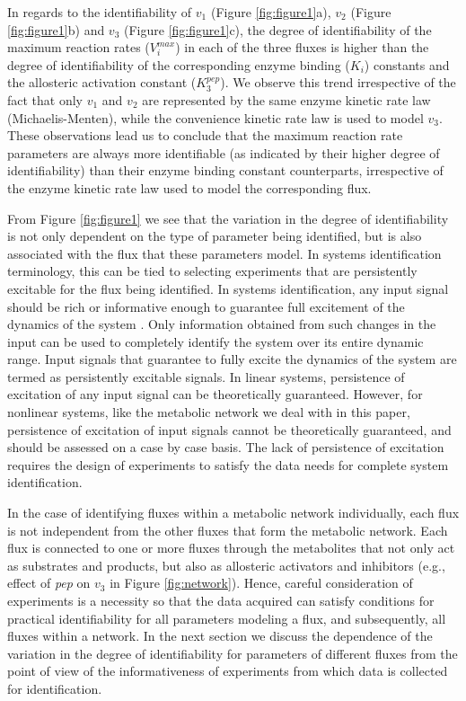 \documentclass[10pt]{article}
\begin{document}
In regards to the identifiability of $v_1$ (Figure \ref{fig:figure1}a), $v_2$ (Figure \ref{fig:figure1}b) and $v_3$ (Figure \ref{fig:figure1}c), the degree of identifiability of the maximum reaction rates ($V_i^{max}$) in each of the three fluxes is higher than the degree of identifiability of the corresponding enzyme binding ($K_i$) constants and the allosteric activation constant ($K_3^{pep}$). We observe this trend irrespective of the fact that only  $v_1$ and $v_2$ are represented by the same enzyme kinetic rate law (Michaelis-Menten), while the convenience kinetic rate law is used to model $v_3$. These observations lead us to conclude that the maximum reaction rate parameters are always more identifiable (as indicated by their higher degree of identifiability) than their enzyme binding constant counterparts, irrespective of the enzyme kinetic rate law used to model the corresponding flux.

From Figure \ref{fig:figure1} we see that the variation in the degree of identifiability is not only dependent on the type of parameter being identified, but is also associated with the flux that these parameters model.	In systems identification terminology, this can be tied to selecting experiments that are persistently excitable for the flux being identified. In systems identification, any input signal should be rich or informative enough to guarantee full excitement of the dynamics of the system \parencite{Ljung1994}. Only information obtained from such changes in the input can be used to completely identify the system over its entire dynamic range. Input signals that guarantee to fully excite the dynamics of the system are termed as persistently excitable signals. In linear systems, persistence of excitation of any input signal can be theoretically guaranteed. However, for nonlinear systems, like the metabolic network we deal with in this paper, persistence of excitation of input signals cannot be theoretically guaranteed, and should be assessed on a case by case basis. The lack of persistence of excitation requires the design of experiments to satisfy the data needs for complete system identification. 

In the case of identifying fluxes within a metabolic network individually, each flux is not independent from the other fluxes that form the metabolic network. Each flux is connected to one or more fluxes through the metabolites that not only act as substrates and products, but also as allosteric activators and inhibitors (e.g., effect of \textit{pep} on $v_3$ in Figure \ref{fig:network}). Hence, careful consideration of experiments is a necessity so that the data acquired can satisfy conditions for practical identifiability for all parameters modeling a flux, and subsequently, all fluxes within a network. In the next section we discuss the dependence of the variation in the degree of identifiability for parameters of different fluxes from the point of view of the informativeness of experiments from which data is collected for identification.
\end{document}
